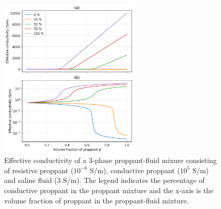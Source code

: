 \begin{figure}
    \begin{center}
    \includegraphics[width=0.6\textwidth]{figures/phys_prop_model/emt_3phase.png}
    \end{center}
\caption{
    Effective conductivity of a 3-phase proppant-fluid mixure consisting of
    resistive proppant ($10^{-6}$ S/m), conductive proppant ($10^5$ S/m) and saline
    fluid (3 S/m). The legend indicates the percentage of conductive proppant in the
    proppant mixture and the x-axis is the volume fraction of proppant in the
    proppant-fluid mixture.
}
\label{fig:emt_3phase}
\end{figure}
